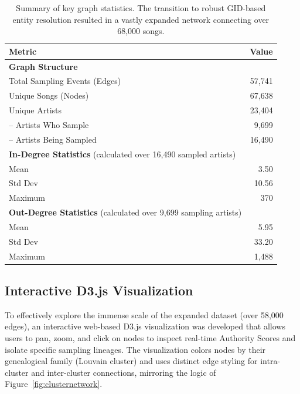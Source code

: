 \documentclass[a4paper, 12pt]{article}
\begin{document}
\begin{table}[H]
    \centering
    \begin{tabular}{lr}
    \toprule
    \textbf{Metric} & \textbf{Value} \\
    \midrule
    \textbf{Graph Structure} & \\
    Total Sampling Events (Edges) & 57,741 \\
    Unique Songs (Nodes) & 67,638 \\
    Unique Artists & 23,404 \\
    -- Artists Who Sample & 9,699 \\
    -- Artists Being Sampled & 16,490 \\
    \midrule
    \textbf{In-Degree Statistics} (calculated over 16,490 sampled artists) \\
    Mean & 3.50 \\
    Std Dev & 10.56 \\
    Maximum & 370 \\
    \midrule
    \textbf{Out-Degree Statistics} (calculated over 9,699 sampling artists) \\
    Mean & 5.95 \\
    Std Dev & 33.20 \\
    Maximum & 1,488 \\
    \bottomrule
    \end{tabular}
    \caption{Summary of key graph statistics. The transition to robust GID-based entity resolution resulted in a vastly expanded network connecting over 68,000 songs.}
    \label{tab:graphstats}
\end{table}

\subsection{Interactive D3.js Visualization}
To effectively explore the immense scale of the expanded dataset (over 58,000 edges), an interactive web-based D3.js visualization was developed that allows users to pan, zoom, and click on nodes to inspect real-time Authority Scores and isolate specific sampling lineages. The visualization colors nodes by their genealogical family (Louvain cluster) and uses distinct edge styling for intra-cluster and inter-cluster connections, mirroring the logic of Figure~\ref{fig:clusternetwork}. 

\vspace{0.3cm}
\begin{center}
\end{center}
\vspace{0.3cm}
\end{document}
